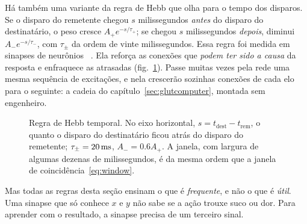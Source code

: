 Há também uma variante da regra de Hebb que olha para o tempo dos disparos. Se o disparo do remetente chegou $s$ milissegundos \emph{antes} do disparo do destinatário, o peso cresce $A_+e^{-s/\tau_+}$; se chegou $s$ milissegundos \emph{depois}, diminui $A_-e^{-s/\tau_-}$, com $\tau_\pm$ da ordem de vinte milissegundos. Essa regra foi medida em sinapses de neurônios ~\cite{BiPoo1998}. Ela reforça as conexões que \emph{podem ter sido a causa} da resposta e enfraquece as atrasadas (fig.~\ref{fig:stdp}). Passe muitas vezes pela rede uma mesma sequência de excitações, e nela crescerão sozinhas conexões de cada elo para o seguinte: a cadeia do capítulo~\ref{sec:glutcomputer}, montada sem engenheiro.

\begin{figure}[t]
\centering
{}
\caption{Regra de Hebb temporal. No eixo horizontal, $s=t_{\text{dest}}-t_{\text{rem}}$, o quanto o disparo do destinatário ficou atrás do disparo do remetente; $\tau_\pm=20\,\text{ms}$, $A_-=0.6A_+$. A janela, com largura de algumas dezenas de milissegundos, é da mesma ordem que a janela de coincidência~\eqref{eq:window}.}
\label{fig:stdp}
\end{figure}

Mas todas as regras desta seção ensinam o que é \emph{frequente}, e não o que é \emph{útil}. Uma sinapse que só conhece $x$ e $y$ não sabe se a ação trouxe suco ou dor. Para aprender com o resultado, a sinapse precisa de um terceiro sinal.

